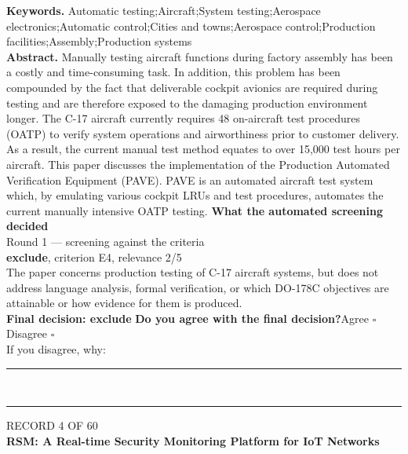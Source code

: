 \documentclass[11pt,a4paper]{article}
\begin{document}
{\small\textbf{Keywords.} Automatic testing;Aircraft;System testing;Aerospace electronics;Automatic control;Cities and towns;Aerospace control;Production facilities;Assembly;Production systems}\\[2mm]
{\small\textbf{Abstract.} Manually testing aircraft functions during factory assembly has been a costly and time-consuming task. In addition, this problem has been compounded by the fact that deliverable cockpit avionics are required during testing and are therefore exposed to the damaging production environment longer. The C-17 aircraft currently requires 48 on-aircraft test procedures (OATP) to verify system operations and airworthiness prior to customer delivery. As a result, the current manual test method equates to over 15,000 test hours per aircraft. This paper discusses the implementation of the Production Automated Verification Equipment (PAVE). PAVE is an automated aircraft test system which, by emulating various cockpit LRUs and test procedures, automates the current manually intensive OATP testing.}
\vspace{3mm}
\vspace{2.5mm}
{\small\textbf{What the automated screening decided}}\\[2mm]
{\footnotesize\color{soft}Round 1 --- screening against the criteria}\\[0.5mm]
{\small\textbf{exclude}, criterion E4, relevance 2/5}\\[0.5mm]
{\small The paper concerns production testing of C-17 aircraft systems, but does not address language analysis, formal verification, or which DO-178C objectives are attainable or how evidence for them is produced.}\\[2.5mm]
{\small\textbf{Final decision: exclude}}
\vspace{2mm}
{\small\textbf{Do you agree with the final decision?}\quad{}Agree $\square$\qquad{}Disagree $\square$}\\[1mm]
{\footnotesize\color{soft}If you disagree, why:}\\[1mm]
\color{rule}\rule{\linewidth}{0.3pt}\\[3mm]\rule{\linewidth}{0.3pt}\color{black}
\clearpage
{\color{soft}\footnotesize RECORD 4 OF 60}\\[1mm]
{\large\bfseries RSM: A Real-time Security Monitoring Platform for IoT Networks}\\[1.5mm]
\end{document}
